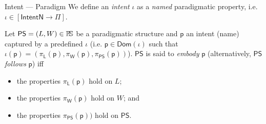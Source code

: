 \begin{Definition}{Intent --- Paradigm}
   We define an \emph{intent} $\iota$ as a \emph{named} paradigmatic property, 
i.e. $\iota \in [\mathsf{IntentN} \to \Pi]$.

   Let $\mathsf{PS} = (L, W)\in\mathbb{P}\!\mathbb{S}$ be a paradigmatic structure and 
$\mathsf{p}$ an intent (name) captured by a predefined $\iota$ (i.e. 
$\mathsf{p}\in \mathsf{Dom}(\iota)$ such that 
$\iota(\mathsf{p}) = (\pi_{\mathsf{L}}(\mathsf{p}), 
                     \pi_{\mathsf{W}}(\mathsf{p}), 
                     \pi_{\mathsf{PS}}(\mathsf{p}))$). 
$\mathsf{PS}$ is said to \emph{embody} $\mathsf{p}$ (alternatively, 
$\mathsf{PS}$ \emph{follows} $\mathsf{p}$) iff 
\begin{itemize}
   \item the properties $\pi_{\mathsf{L}}(\mathsf{p})$ hold on $L$;
   \item the properties $\pi_{\mathsf{W}}(\mathsf{p})$ hold on $W$; and
   \item the properties $ \pi_{\mathsf{PS}}(\mathsf{p}))$ hold on $\mathsf{PS}$.
\end{itemize}

\end{Definition}


